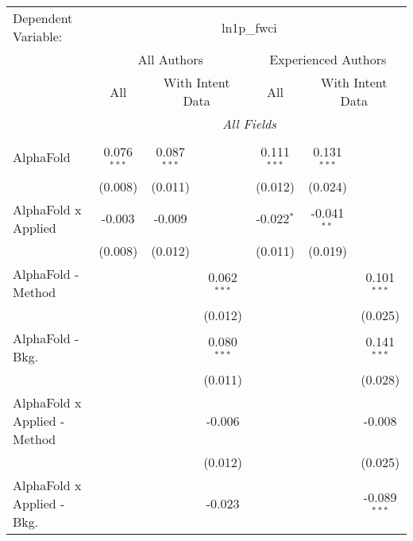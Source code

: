 \begingroup
\centering
\begin{tabular}{lcccccc}
   \tabularnewline \midrule \midrule
   Dependent Variable: & \multicolumn{6}{c}{ln1p\_fwci}\\
 & \multicolumn{3}{c}{All Authors} & \multicolumn{3}{c}{Experienced Authors} \\
\cmidrule(lr){2-4} \cmidrule(lr){5-7}
 & \multicolumn{1}{c}{All} & \multicolumn{2}{c}{With Intent Data} & \multicolumn{1}{c}{All} & \multicolumn{2}{c}{With Intent Data} \\
\cmidrule(lr){2-2} \cmidrule(lr){3-4} \cmidrule(lr){5-5} \cmidrule(lr){6-7}
 & \multicolumn{6}{c}{\textit{All Fields}} \\ \\
   AlphaFold                      & 0.076$^{***}$ & 0.087$^{***}$ &               & 0.111$^{***}$ & 0.131$^{***}$ &   \\   
                                  & (0.008)       & (0.011)       &               & (0.012)       & (0.024)       &   \\   
   AlphaFold x Applied            & -0.003        & -0.009        &               & -0.022$^{*}$  & -0.041$^{**}$ &   \\   
                                  & (0.008)       & (0.012)       &               & (0.011)       & (0.019)       &   \\   
   AlphaFold - Method             &               &               & 0.062$^{***}$ &               &               & 0.101$^{***}$\\   
                                  &               &               & (0.012)       &               &               & (0.025)\\   
   AlphaFold - Bkg.               &               &               & 0.080$^{***}$ &               &               & 0.141$^{***}$\\   
                                  &               &               & (0.011)       &               &               & (0.028)\\   
   AlphaFold x Applied - Method   &               &               & -0.006        &               &               & -0.008\\   
                                  &               &               & (0.012)       &               &               & (0.025)\\   
   AlphaFold x Applied - Bkg.     &               &               & -0.023        &               &               & -0.089$^{***}$\\   

\end{tabular}
